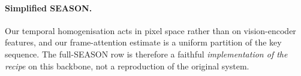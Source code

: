 \paragraph{Simplified SEASON.}
Our temporal homogenisation acts in pixel space rather than on vision-encoder features, and our frame-attention estimate is a uniform partition of the key sequence.
The full-SEASON row is therefore a faithful \emph{implementation of the recipe} on this backbone, not a reproduction of the original system.
